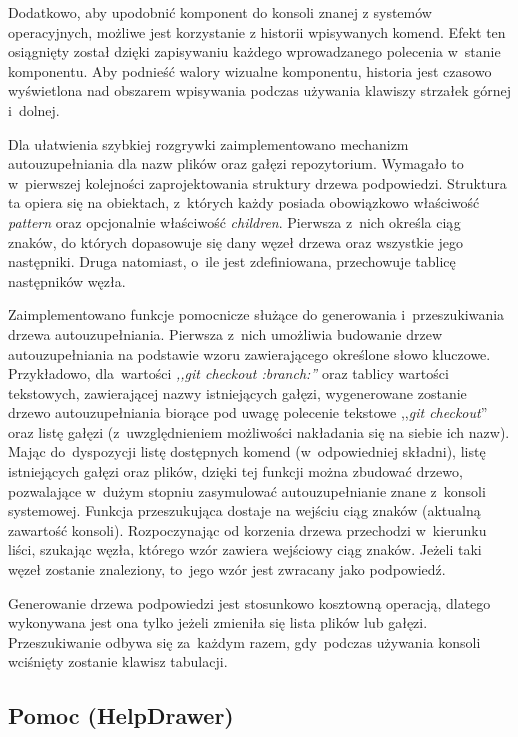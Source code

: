 \documentclass[12pt,a4paper,polish,thesis]{dcsbook}
\begin{document}
{	Dodatkowo, aby upodobnić komponent do konsoli znanej z systemów operacyjnych, możliwe jest korzystanie z historii wpisywanych komend. Efekt ten osiągnięty został dzięki zapisywaniu każdego wprowadzanego polecenia w~stanie komponentu. Aby podnieść walory wizualne komponentu, historia jest czasowo wyświetlona nad obszarem wpisywania podczas używania klawiszy strzałek górnej i~dolnej.

	Dla ułatwienia szybkiej rozgrywki zaimplementowano mechanizm autouzupełniania dla nazw plików oraz gałęzi repozytorium. Wymagało to w~pierwszej kolejności zaprojektowania struktury drzewa podpowiedzi. Struktura ta opiera się na obiektach, z~których każdy posiada obowiązkowo właściwość \textit{pattern} oraz opcjonalnie właściwość \textit{children}. Pierwsza z~nich określa ciąg znaków, do których dopasowuje się dany węzeł drzewa oraz wszystkie jego następniki. Druga natomiast, o~ile jest zdefiniowana, przechowuje tablicę następników węzła.

	Zaimplementowano funkcje pomocnicze służące do generowania i~przeszukiwania drzewa autouzupełniania. Pierwsza z~nich umożliwia budowanie drzew autouzupełniania na podstawie wzoru zawierającego określone słowo kluczowe. Przykładowo, dla~wartości \textit{,,git checkout :branch:''} oraz tablicy wartości tekstowych, zawierającej nazwy istniejących gałęzi, wygenerowane zostanie drzewo autouzupełniania biorące pod uwagę polecenie tekstowe ,,\textit{git checkout}'' oraz listę gałęzi (z~uwzględnieniem możliwości nakładania się na siebie ich nazw). Mając do~dyspozycji listę dostępnych komend (w~odpowiedniej składni), listę istniejących gałęzi oraz plików, dzięki tej funkcji można zbudować drzewo, pozwalające w~dużym stopniu zasymulować autouzupełnianie znane z~konsoli systemowej. Funkcja przeszukująca dostaje na wejściu ciąg znaków (aktualną zawartość konsoli). Rozpoczynając od korzenia drzewa przechodzi w~kierunku liści, szukając węzła, którego wzór zawiera wejściowy ciąg znaków. Jeżeli taki węzeł zostanie znaleziony, to~jego wzór jest zwracany jako podpowiedź.

	Generowanie drzewa podpowiedzi jest stosunkowo kosztowną operacją, dlatego wykonywana jest ona tylko jeżeli zmieniła się lista plików lub gałęzi. Przeszukiwanie odbywa się za~każdym razem, gdy~podczas używania konsoli wciśnięty zostanie klawisz tabulacji.

	\subsection{Pomoc (HelpDrawer)}

}
\end{document}
